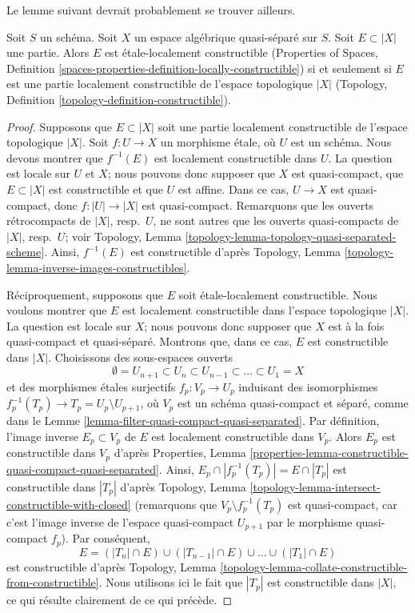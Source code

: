 \noindent
Le lemme suivant devrait probablement se trouver ailleurs.

\begin{lemma}
\label{lemma-locally-constructible}
Soit $S$ un schéma. Soit $X$ un espace algébrique quasi-séparé sur $S$.
Soit $E \subset |X|$ une partie. Alors $E$ est étale-localement constructible
(Properties of Spaces, Definition
\ref{spaces-properties-definition-locally-constructible})
si et seulement si $E$ est une partie localement constructible de
l'espace topologique $|X|$
(Topology, Definition \ref{topology-definition-constructible}).
\end{lemma}

\begin{proof}
Supposons que $E \subset |X|$ soit une partie localement constructible de
l'espace topologique $|X|$. Soit $f : U \to X$ un morphisme étale, où $U$
est un schéma. Nous devons montrer que $f^{-1}(E)$ est localement constructible
dans $U$. La question est locale sur $U$ et $X$; nous pouvons donc supposer
que $X$ est quasi-compact, que $E \subset |X|$ est constructible et que $U$
est affine. Dans ce cas, $U \to X$ est quasi-compact, donc
$f : |U| \to |X|$ est quasi-compact. Remarquons que les ouverts rétrocompacts
de $|X|$, resp.\ $U$, ne sont autres que les ouverts quasi-compacts de
$|X|$, resp.\ $U$; voir
Topology, Lemma \ref{topology-lemma-topology-quasi-separated-scheme}.
Ainsi, $f^{-1}(E)$ est constructible d'après Topology, Lemma
\ref{topology-lemma-inverse-images-constructibles}.

\medskip\noindent
Réciproquement, supposons que $E$ soit étale-localement constructible.
Nous voulons montrer que $E$ est localement constructible dans l'espace
topologique $|X|$. La question est locale sur $X$; nous pouvons donc supposer
que $X$ est à la fois quasi-compact et quasi-séparé. Montrons que, dans ce cas,
$E$ est constructible dans $|X|$. Choisissons des sous-espaces ouverts
$$
\emptyset = U_{n + 1} \subset
U_n \subset U_{n - 1} \subset \ldots \subset U_1 = X
$$
et des morphismes étales surjectifs $f_p : V_p \to U_p$ induisant des
isomorphismes $f_p^{-1}(T_p) \to T_p = U_p \setminus U_{p + 1}$, où $V_p$
est un schéma quasi-compact et séparé, comme dans le
Lemme \ref{lemma-filter-quasi-compact-quasi-separated}.
Par définition, l'image inverse $E_p \subset V_p$ de $E$ est localement
constructible dans $V_p$. Alors $E_p$ est constructible dans $V_p$ d'après
Properties, Lemma
\ref{properties-lemma-constructible-quasi-compact-quasi-separated}.
Ainsi, $E_p \cap |f_p^{-1}(T_p)| = E \cap |T_p|$ est constructible dans
$|T_p|$ d'après
Topology, Lemma \ref{topology-lemma-intersect-constructible-with-closed}
(remarquons que $V_p \setminus f_p^{-1}(T_p)$ est quasi-compact, car c'est
l'image inverse de l'espace quasi-compact $U_{p + 1}$ par le morphisme
quasi-compact $f_p$). Par conséquent,
$$
E = (|T_n| \cap E) \cup (|T_{n - 1}| \cap E) \cup \ldots \cup
(|T_1| \cap E)
$$
est constructible d'après
Topology, Lemma \ref{topology-lemma-collate-constructible-from-constructible}.
Nous utilisons ici le fait que $|T_p|$ est constructible dans $|X|$, ce qui
résulte clairement de ce qui précède.
\end{proof}





